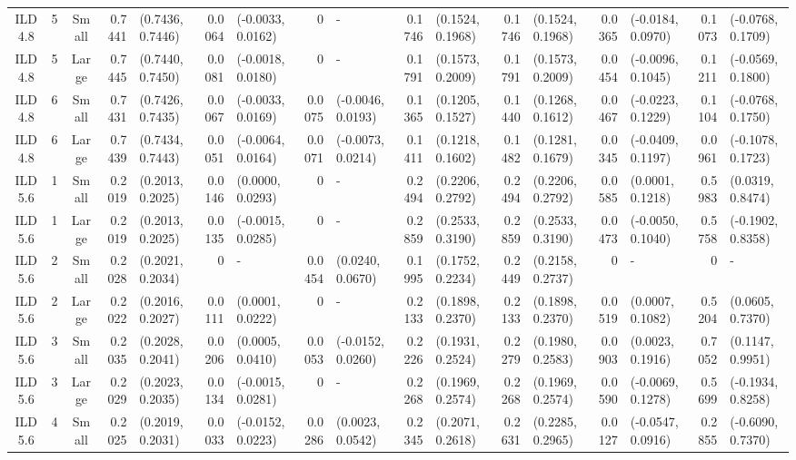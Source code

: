 \begin{landscape}
\begin{table}
\begin{tabular}{cccrlrlrlrlrlrlrl}
ILD4.8	&	5	&	Small	&	0.7441	&	(0.7436, 0.7446)	&	0.0064	&	(-0.0033, 0.0162)	&	0	&	-	&	0.1746	&	(0.1524, 0.1968)	&	0.1746	&	(0.1524, 0.1968)	&	0.0365	&	(-0.0184, 0.0970)	&	0.1073	&	(-0.0768, 0.1709)	\\
ILD4.8	&	5	&	Large	&	0.7445	&	(0.7440, 0.7450)	&	0.0081	&	(-0.0018, 0.0180)	&	0	&	-	&	0.1791	&	(0.1573, 0.2009)	&	0.1791	&	(0.1573, 0.2009)	&	0.0454	&	(-0.0096, 0.1045)	&	0.1211	&	(-0.0569, 0.1800)	\\
ILD4.8	&	6	&	Small	&	0.7431	&	(0.7426, 0.7435)	&	0.0067	&	(-0.0033, 0.0169)	&	0.0075	&	(-0.0046, 0.0193)	&	0.1365	&	(0.1205, 0.1527)	&	0.1440	&	(0.1268, 0.1612)	&	0.0467	&	(-0.0223, 0.1229)	&	0.1104	&	(-0.0768, 0.1750)	\\
ILD4.8	&	6	&	Large	&	0.7439	&	(0.7434, 0.7443)	&	0.0051	&	(-0.0064, 0.0164)	&	0.0071	&	(-0.0073, 0.0214)	&	0.1411	&	(0.1218, 0.1602)	&	0.1482	&	(0.1281, 0.1679)	&	0.0345	&	(-0.0409, 0.1197)	&	0.0961	&	(-0.1078, 0.1723)	\\
ILD5.6	&	1	&	Small	&	0.2019	&	(0.2013, 0.2025)	&	0.0146	&	(0.0000, 0.0293)	&	0	&	-	&	0.2494	&	(0.2206, 0.2792)	&	0.2494	&	(0.2206, 0.2792)	&	0.0585	&	(0.0001, 0.1218)	&	0.5983	&	(0.0319, 0.8474)	\\
ILD5.6	&	1	&	Large	&	0.2019	&	(0.2013, 0.2025)	&	0.0135	&	(-0.0015, 0.0285)	&	0	&	-	&	0.2859	&	(0.2533, 0.3190)	&	0.2859	&	(0.2533, 0.3190)	&	0.0473	&	(-0.0050, 0.1040)	&	0.5758	&	(-0.1902, 0.8358)	\\
ILD5.6	&	2	&	Small	&	0.2028	&	(0.2021, 0.2034)	&	0	&	-	&	0.0454	&	(0.0240, 0.0670)	&	0.1995	&	(0.1752, 0.2234)	&	0.2449	&	(0.2158, 0.2737)	&	0	&	-	&	0	&	-	\\
ILD5.6	&	2	&	Large	&	0.2022	&	(0.2016, 0.2027)	&	0.0111	&	(0.0001, 0.0222)	&	0	&	-	&	0.2133	&	(0.1898, 0.2370)	&	0.2133	&	(0.1898, 0.2370)	&	0.0519	&	(0.0007, 0.1082)	&	0.5204	&	(0.0605, 0.7370)	\\
ILD5.6	&	3	&	Small	&	0.2035	&	(0.2028, 0.2041)	&	0.0206	&	(0.0005, 0.0410)	&	0.0053	&	(-0.0152, 0.0260)	&	0.2226	&	(0.1931, 0.2524)	&	0.2279	&	(0.1980, 0.2583)	&	0.0903	&	(0.0023, 0.1916)	&	0.7052	&	(0.1147, 0.9951)	\\
ILD5.6	&	3	&	Large	&	0.2029	&	(0.2023, 0.2035)	&	0.0134	&	(-0.0015, 0.0281)	&	0	&	-	&	0.2268	&	(0.1969, 0.2574)	&	0.2268	&	(0.1969, 0.2574)	&	0.0590	&	(-0.0069, 0.1278)	&	0.5699	&	(-0.1934, 0.8258)	\\
ILD5.6	&	4	&	Small	&	0.2025	&	(0.2019, 0.2031)	&	0.0033	&	(-0.0152, 0.0223)	&	0.0286	&	(0.0023, 0.0542)	&	0.2345	&	(0.2071, 0.2618)	&	0.2631	&	(0.2285, 0.2965)	&	0.0127	&	(-0.0547, 0.0916)	&	0.2855	&	(-0.6090, 0.7370)	\\

\end{tabular}
\end{table}
\end{landscape}
